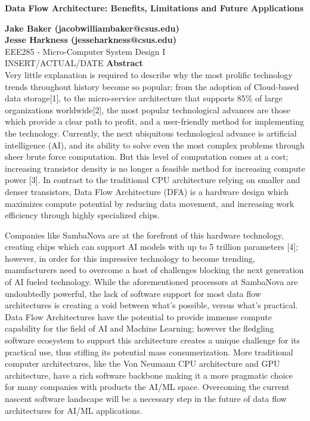\begin{titlepage}
    \begin{center}
        \vspace*{-20mm}
        \Huge
        \textbf{Data Flow Architecture: Benefits, Limitations and Future Applications}\\
         \large
        
        \vspace{0.5 cm}
        \textbf{
        Jake Baker (jacobwilliambaker@csus.edu) \\
        Jesse Harkness (jesseharkness@csus.edu)}
        \\ EEE285 - Micro-Computer System Design I
        \\INSERT/ACTUAL/DATE
        \vfill
        \vspace{1cm}
        \textbf{Abstract}\\
        Very little explanation is required to describe why the most prolific technology trends throughout history become so popular; from the adoption of Cloud-based data storage[1], to the micro-service architecture that supports 85\% of large organizations worldwide[2], the most popular technological advances are those which provide a clear path to profit, and a user-friendly method for implementing the technology.  Currently, the next ubiquitous technological advance is artificial intelligence (AI), and its ability to solve even the most complex problems through sheer brute force computation.  But this level of computation comes at a cost; increasing transistor density is no longer a feasible method for increasing compute power [3].  In contrast to the traditional CPU architecture relying on smaller and denser transistors, Data Flow Architecture (DFA) is a hardware design which maximizes compute potential by reducing data movement, and increasing work efficiency through highly specialized chips.  
\par
Companies like SambaNova are at the forefront of this hardware technology, creating chips which can support AI models with up to 5 trillion parameters [4]; however, in order for this impressive technology to become trending, manufacturers need to overcome a host of challenges blocking the next generation of AI fueled technology.  While the aforementioned processors at SambaNova are undoubtedly powerful, the lack of software support for most data flow architectures is creating a void between what's possible, versus what's practical.  Data Flow Architectures have the potential to provide immense compute capability for the field of AI and Machine Learning; however the fledgling software ecosystem to support this architecture creates a unique challenge for its practical use, thus stifling its potential mass consumerization.  More traditional computer architectures, like the Von Neumann CPU architecture and GPU architecture, have a rich software backbone making it a more pragmatic choice for many companies with products the AI/ML space.  Overcoming the current nascent software landscape will be a necessary step in the future of data flow architectures for AI/ML applications. 
        

\end{center}
\end{titlepage}
